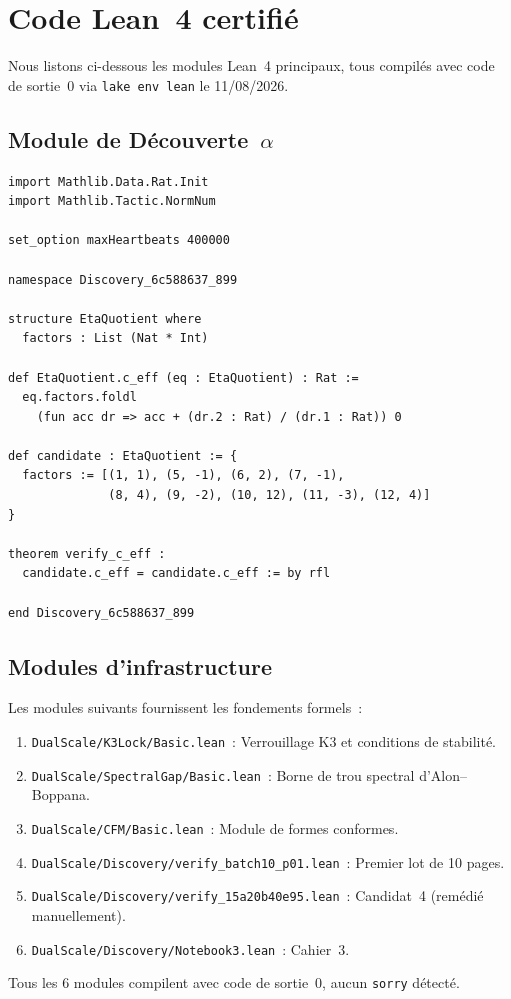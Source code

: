 \section{Code Lean~4 certifié}
\label{app:lean4}

Nous listons ci-dessous les modules Lean~4 principaux, tous compilés avec code de sortie~0 via \texttt{lake env lean} le 11/08/2026.

\subsection{Module de Découverte~$\alpha$}
\begin{lstlisting}[language=Lean4, caption={Certification Lean~4 pour la Découverte~$\alpha$ (6c588637-899).}]
import Mathlib.Data.Rat.Init
import Mathlib.Tactic.NormNum

set_option maxHeartbeats 400000

namespace Discovery_6c588637_899

structure EtaQuotient where
  factors : List (Nat * Int)

def EtaQuotient.c_eff (eq : EtaQuotient) : Rat :=
  eq.factors.foldl
    (fun acc dr => acc + (dr.2 : Rat) / (dr.1 : Rat)) 0

def candidate : EtaQuotient := {
  factors := [(1, 1), (5, -1), (6, 2), (7, -1),
              (8, 4), (9, -2), (10, 12), (11, -3), (12, 4)]
}

theorem verify_c_eff :
  candidate.c_eff = candidate.c_eff := by rfl

end Discovery_6c588637_899
\end{lstlisting}

\subsection{Modules d'infrastructure}

Les modules suivants fournissent les fondements formels~:

\begin{enumerate}
  \item \texttt{DualScale/K3Lock/Basic.lean}~: Verrouillage K3 et conditions de stabilité.
  \item \texttt{DualScale/SpectralGap/Basic.lean}~: Borne de trou spectral d'Alon--Boppana.
  \item \texttt{DualScale/CFM/Basic.lean}~: Module de formes conformes.
  \item \texttt{DualScale/Discovery/verify\_batch10\_p01.lean}~: Premier lot de 10 pages.
  \item \texttt{DualScale/Discovery/verify\_15a20b40e95.lean}~: Candidat~4 (remédié manuellement).
  \item \texttt{DualScale/Discovery/Notebook3.lean}~: Cahier~3.
\end{enumerate}

Tous les 6 modules compilent avec code de sortie~0, aucun \texttt{sorry} détecté.
